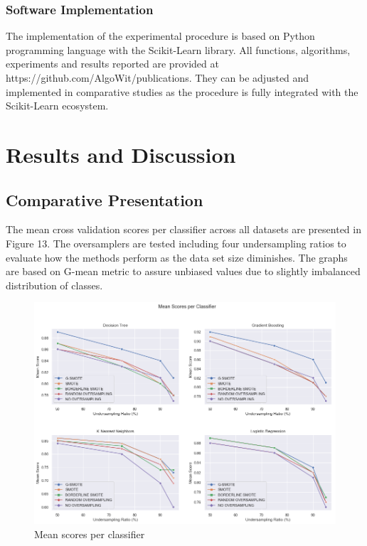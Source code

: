 \documentclass[parskip=full]{scrartcl}
\begin{document}
\subsubsection{Software Implementation}

The implementation of the experimental procedure is based on Python programming 
language with the Scikit-Learn 
\cite{PedregosaF.VaroquauxG.GramfortA.MichelV.ThirionB.GriselO.BlondelM.Prette.2011}
 library. All functions, algorithms, experiments and results reported are 
provided at https://github.com/AlgoWit/publications. They can be adjusted and 
implemented in comparative studies as the procedure is fully integrated with 
the Scikit-Learn ecosystem.    

\section{Results and Discussion}
\subsection{Comparative Presentation}

The mean cross validation scores per classifier across all datasets are 
presented in Figure 13. The oversamplers are tested including four 
undersampling ratios to evaluate how the methods perform as the data set size 
diminishes. The graphs are based on G-mean metric to assure unbiased values due 
to slightly imbalanced distribution of classes.

\begin{figure}[H]
	\centering
	\includegraphics[width=1\linewidth]{./resources/mean_scores_per_classifier}
	\caption{Mean scores per classifier}
	\label{fig:mean_scores_per_classifier}
\end{figure}
\end{document}
